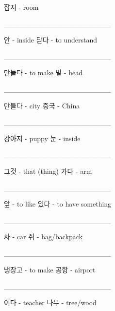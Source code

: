 \documentclass[addpoints, 30pt]{../exam}%
\begin{document}
\begin{questions}
\begin{choices}
잡지 {-} room%
\end{choices}%
\question[1]%
\_\_\_\_\_\_\_\_\_\_\_\_\_\_\_\_\_\_\_\_\_%
\begin{choices}%
\CorrectChoice%
안 {-} inside%
\choice%
닫다 {-} to understand%
\end{choices}%
\question[1]%
\_\_\_\_\_\_\_\_\_\_\_\_\_\_\_\_\_\_\_\_\_%
\begin{choices}%
\CorrectChoice%
만들다 {-} to make%
\choice%
밑 {-} head%
\end{choices}%
\question[1]%
\_\_\_\_\_\_\_\_\_\_\_\_\_\_\_\_\_\_\_\_\_%
\begin{choices}%
\choice%
만들다 {-} city%
\CorrectChoice%
중국 {-} China%
\end{choices}%
\question[1]%
\_\_\_\_\_\_\_\_\_\_\_\_\_\_\_\_\_\_\_\_\_%
\begin{choices}%
\CorrectChoice%
강아지 {-} puppy%
\choice%
눈 {-} inside%
\end{choices}%
\question[1]%
\_\_\_\_\_\_\_\_\_\_\_\_\_\_\_\_\_\_\_\_\_%
\begin{choices}%
\CorrectChoice%
그것 {-} that (thing)%
\choice%
가다 {-} arm%
\end{choices}%
\question[1]%
\_\_\_\_\_\_\_\_\_\_\_\_\_\_\_\_\_\_\_\_\_%
\begin{choices}%
\choice%
앞 {-} to like%
\CorrectChoice%
있다 {-} to have something%
\end{choices}%
\question[1]%
\_\_\_\_\_\_\_\_\_\_\_\_\_\_\_\_\_\_\_\_\_%
\begin{choices}%
\CorrectChoice%
차 {-} car%
\choice%
쥐 {-} bag/backpack%
\end{choices}%
\question[1]%
\_\_\_\_\_\_\_\_\_\_\_\_\_\_\_\_\_\_\_\_\_%
\begin{choices}%
\choice%
냉장고 {-} to make%
\CorrectChoice%
공항 {-} airport%
\end{choices}%
\question[1]%
\_\_\_\_\_\_\_\_\_\_\_\_\_\_\_\_\_\_\_\_\_%
\begin{choices}%
\choice%
이다 {-} teacher%
\CorrectChoice%
나무 {-} tree/wood%
\end{choices}%
\end{questions}%
\end{document}
